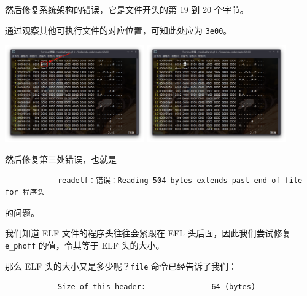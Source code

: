 \documentclass{ctexbeamer}
\begin{document}
    \begin{frame}[fragile]
    
        然后修复系统架构的错误，它是文件开头的第 19 到 20 个字节。

        通过观察其他可执行文件的对应位置，可知此处应为 \texttt{3e00}。

        \begin{center}
            \includegraphics[width=0.45\textwidth]{pics/lvl3-error2-before.png}\;
            \includegraphics[width=0.45\textwidth]{pics/lvl3-error2-after.png}
        \end{center}
    
    \end{frame}

    \begin{frame}[fragile]
    
        然后修复第三处错误，也就是
        
        \begin{verbatim}
            readelf：错误：Reading 504 bytes extends past end of file for 程序头
        \end{verbatim}

        的问题。 \pause

        我们知道 ELF 文件的程序头往往会紧跟在 EFL 头后面，因此我们尝试修复 \texttt{e_phoff} 的值，令其等于 ELF 头的大小。\pause
        
        那么 ELF 头的大小又是多少呢？\texttt{file} 命令已经告诉了我们：

        \begin{verbatim}
            Size of this header:               64 (bytes)
        \end{verbatim}
    
    \end{frame}
\end{document}
